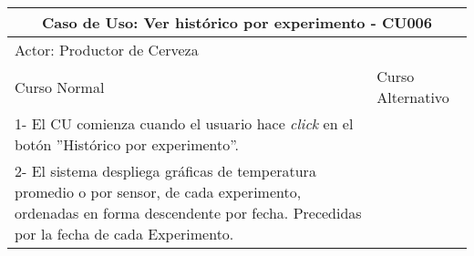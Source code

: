     \begin{table}[H]
    \begin{center}
    \begin{tabularx}{\textwidth}{ | X | X |}
        \hline
        \multicolumn{2}{|c|}{\textbf{Caso de Uso: Ver histórico por experimento - CU006}} \\
        \hline
        \multicolumn{2}{|l|}{Actor: Productor de Cerveza} \\
        \hline
        Curso Normal & Curso Alternativo \\
        \hline
        1- El CU comienza cuando el usuario hace \textit{click} en el botón ”Histórico por experimento”. & \\
        \hline
        2- El sistema despliega gráficas de temperatura promedio o por sensor, de cada experimento, ordenadas en forma descendente por fecha. Precedidas por la fecha de cada Experimento. & 
        \\
        \hline
    \end{tabularx}
    \label{CU006}
    \end{center}
    \end{table}
    
